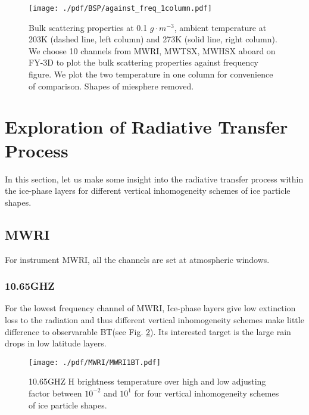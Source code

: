 \begin{figure}[hbtp] 
\centering
\texttt{[image: ./pdf/BSP/against\_freq\_1column.pdf]}
\caption{Bulk scattering properties at 0.1 $g \cdot m^{-3}$, ambient temperature at 203K (dashed line, left column) and 273K (solid line, right column).
We choose 10 channels from MWRI, MWTSX, MWHSX aboard on FY-3D to plot the bulk scattering properties against frequency figure.
We plot the two temperature in one column for convenience of comparison. Shapes of miesphere removed.}
\label{fig:against_freq_1column}
\end{figure}

\clearpage

\section{Exploration of Radiative Transfer Process}

In this section, let us make some insight into the radiative transfer process within the ice-phase layers for 
different vertical inhomogeneity schemes of ice particle shapes.

\subsection{MWRI}
For instrument MWRI, all the channels are set at atmospheric windows.

\subsubsection{10.65GHZ}
For the lowest frequency channel of MWRI, Ice-phase layers give low extinction loss to the radiation and thus different vertical inhomogeneity
schemes make little difference to observarable BT(see Fig. \ref{fig:MWRI1BT}). Its interested target is the large rain drops in low latitude layers.

\begin{figure}[hbtp] 
\centering
\texttt{[image: ./pdf/MWRI/MWRI1BT.pdf]}
\caption{10.65GHZ H brightness temperature over high and low adjusting factor between $10^{-2}$ and $10^{1}$ for four vertical 
inhomogeneity schemes of ice particle shapes.}
\label{fig:MWRI1BT}
\end{figure}

